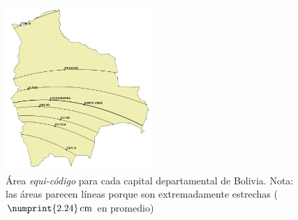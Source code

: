 \documentclass[letterpaper]{article}
\begin{document}
\begin{figure}[p]
	\centering
	\includegraphics[width=0.5\textwidth]{resultados/area_equi_codigo_9_capitales.png}
	\caption{Área \emph{equi-código} para cada capital departamental de Bolivia. Nota: las áreas parecen líneas porque son extremadamente estrechas (\(\numprint{2.24}\,\mathrm{cm}\) en promedio)}
	\label{fig:areas_por_capital}
\end{figure}
\end{document}

